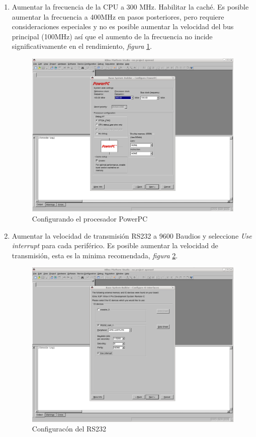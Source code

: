 \begin{enumerate}
  
 \item Aumentar la frecuencia de la CPU a 300 MHz. Habilitar la caché. Es
posible aumentar la frecuencia a 400MHz en pasos posteriores, pero requiere
consideraciones especiales y no es posible aumentar la velocidad del bus
principal (100MHz) así que el aumento de la frecuencia no incide
significativamente en el rendimiento, \emph{figura}
\ref{Configurando el procesador PowerPC}.
  \begin{figure}[h!] 
  \centering
  \includegraphics[scale=.25]{./figuras/EDK5.png}
  \caption{Configurando el procesador PowerPC}
  \label{Configurando el procesador PowerPC}
  \end{figure}
  
  
\item Aumentar la velocidad de transmisión RS232 a 9600 Baudios y seleccione
\emph{Use interrupt} para cada periférico. Es posible aumentar la velocidad de
transmisión, esta es la minima recomendada, \emph{figura}
\ref{Configuracón del RS232}.
  \begin{figure}[h!] 
  \centering
  \includegraphics[scale=.25]{./figuras/EDK6.png}
  \caption{Configuracón del RS232}
  \label{Configuracón del RS232}
  \end{figure}
 

\end{enumerate}
